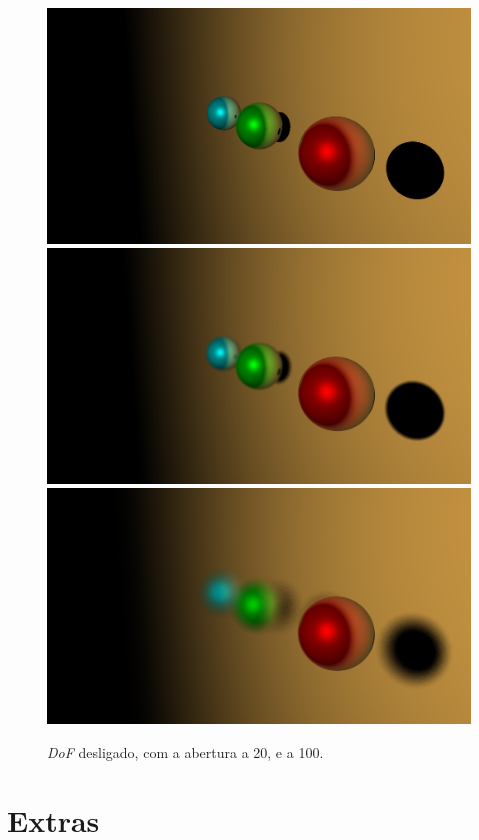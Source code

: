 \documentclass{article}
\begin{document}
        \begin{figure}[h]
            \centering
            \includegraphics[scale=0.08]{dof1}
            \includegraphics[scale=0.08]{dof20}
            \includegraphics[scale=0.08]{dof100}
            \caption{\textit{DoF} desligado, com a abertura a 20, e a 100.}
        \end{figure}  

    \section*{Extras}  
\end{document}
